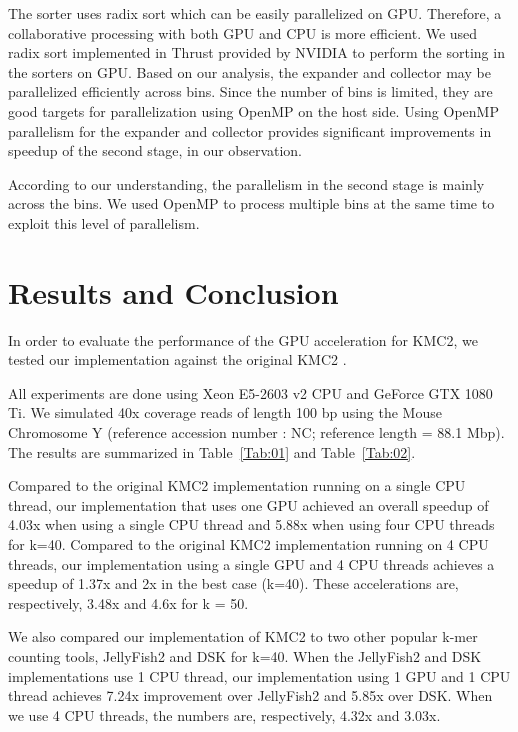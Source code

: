 \documentclass{bioinfo}
\begin{document}
The sorter uses radix sort which can be easily parallelized on GPU.
Therefore, a collaborative processing with both GPU and CPU is more efficient.
We used radix sort implemented in Thrust \citep{Jared} provided by NVIDIA to perform the 
sorting in the sorters on GPU.
Based on our analysis, the expander and collector may be parallelized efficiently across bins.
Since the number of bins is limited, they are good targets for parallelization using OpenMP on 
the host side. Using OpenMP parallelism for the expander and collector provides significant 
improvements in speedup of the second stage, in our observation.

According to our understanding, the parallelism in the second stage is mainly across the bins.
We used OpenMP to process multiple bins at the same time to exploit this level of parallelism.


\section{Results and Conclusion}
In order to evaluate the performance of the GPU acceleration for KMC2, we tested our
implementation against the original KMC2 \citep{Seb14}.

All experiments are done using Xeon E5-2603 v2 CPU and GeForce GTX 1080 Ti.
We simulated 40x coverage reads of length 100 bp using the Mouse Chromosome Y 
(reference accession number : NC; reference length = 88.1 Mbp).
The results are summarized in Table~\ref{Tab:01} and Table~\ref{Tab:02}.

Compared to the original KMC2 implementation \citep{Seb14} running on a single CPU thread, 
our implementation that uses one GPU achieved an overall speedup of 4.03x when using a single 
CPU thread and 5.88x when using four CPU threads for k=40. Compared to the original KMC2 
implementation \citep{Seb14} running on 4 CPU threads, our implementation using a single GPU and 4 
CPU threads achieves a speedup of 1.37x and 2x in the best case (k=40). These accelerations are, 
respectively, 3.48x and 4.6x for k = 50.

We also compared our implementation of KMC2 to two other popular k-mer counting tools, JellyFish2 
and DSK for k=40. When the JellyFish2 and DSK implementations use 1 CPU thread, our implementation 
using 1 GPU and 1 CPU thread achieves 7.24x improvement over JellyFish2 and 5.85x over DSK. When we 
use 4 CPU threads, the numbers are, respectively, 4.32x and 3.03x. 
\end{document}
